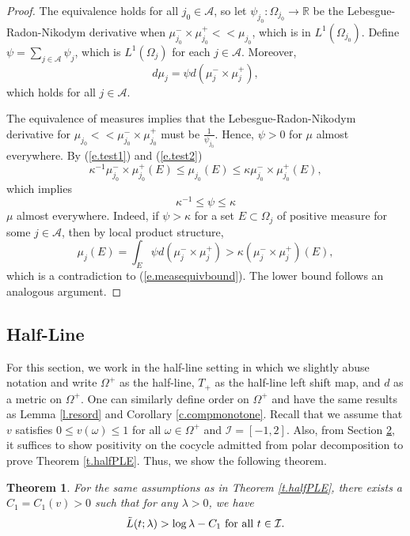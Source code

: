 \documentclass{amsart}
\newtheorem{theorem}{Theorem}
\newcommand{\RR}{\mathbb{R}}
\newcommand{\A}{\mathcal{A}}
\newcommand{\I}{\mathcal{I}}
\begin{document}
\begin{proof}
    The equivalence holds for all $j_0\in \A$, so let $\psi_{j_0}: \Omega_{j_0} \rightarrow \RR$ be the Lebesgue-Radon-Nikodym derivative when $\mu_{j_0}^-\times\mu_{j_0}^+ << \mu_{j_0}$, which is in $L^1(\Omega_{j_0})$. Define $\psi = \sum_{j\in \A} \psi_j$, which is $L^1(\Omega_{j})$ for each $j\in \A$. Moreover, 
    \[d\mu_j = \psi d(\mu^-_j\times \mu^+_j),\]
    which holds for all $j\in \A$.
    
    The equivalence of measures implies that the Lebesgue-Radon-Nikodym derivative for $\mu_{j_0} << \mu_{j_0}^-\times\mu_{j_0}^+$ must be $\frac{1}{\psi_{j_0}}$. Hence, $\psi > 0$ for $\mu$ almost everywhere. By (\ref{e.test1}) and (\ref{e.test2})
    \begin{equation}\label{e.measequivbound}
        \kappa^{-1}\mu_{j_0}^-\times\mu_{j_0}^+(E)\leq \mu_{j_0}(E)\leq \kappa\mu_{j_0}^-\times\mu_{j_0}^+(E),
    \end{equation}
    which implies
    \[\kappa^{-1}\leq \psi \leq \kappa\]
    $\mu$ almost everywhere. Indeed, if $\psi > \kappa$ for a set $E\subset \Omega_j$ of positive measure for some $j\in \A$, then by local product structure,
    \[\mu_j(E) = \int_E \psi d(\mu^-_j\times \mu^+_j) > \kappa (\mu^-_j\times \mu^+_j)(E),\]
    which is a contradiction to (\ref{e.measequivbound}). The lower bound follows an analogous argument.
\end{proof}

\subsection{Half-Line}

For this section, we work in the half-line setting in which we slightly abuse notation and write $\Omega^+$ as the half-line, $T_+$ as the half-line left shift map, and $d$ as a metric on $\Omega^+$. One can similarly define order on $\Omega^+$ and have the same results as Lemma \ref{l.resord} and Corollary \ref{c.compmonotone}. Recall that we assume that $v$ satisfies $0\leq v(\omega)\leq 1$ for all $\omega\in \Omega^+$ and $\I = [-1,2]$. Also, from Section \hyperlink{secprelim}{2}, it suffices to show positivity on the cocycle admitted from polar decomposition to prove Theorem \ref{t.halfPLE}. Thus, we show the following theorem.

\begin{theorem}\label{t.halfPLEpd}
    For the same assumptions as in Theorem \ref{t.halfPLE}, there exists a $C_1 = C_1(v)>0$ such that for any $\lambda> 0$, we have
    \[\Tilde{L}(t;\lambda) > \log\lambda - C_1 \text{ for all } t\in \I.\]
\end{theorem}
\end{document}
